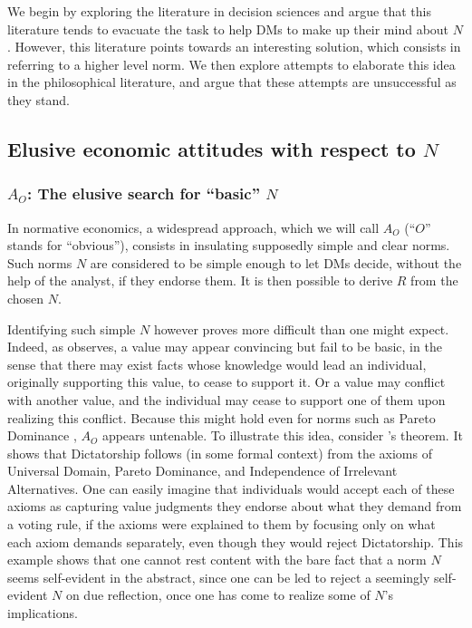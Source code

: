 \documentclass[preprint, french, english, 11pt, authoryear]{elsarticle}%
\newcommand{\protectforpdf}[1]{\texorpdfstring{\ensuremath{#1}}{#1}}
\begin{document}
We begin by exploring the literature in decision sciences and argue that this literature tends to evacuate the task to help \acp{DM} to make up their mind about $N$.
However, this literature points towards an interesting solution, which consists in referring to a higher level norm.
We then explore attempts to elaborate this idea in the philosophical literature, and argue that these attempts are unsuccessful as they stand.

\subsection{Elusive economic attitudes with respect to \protectforpdf{N}}
\subsubsection{\texorpdfstring{$A_O$}{AO}: The elusive search for ``basic'' \protectforpdf{N}}
In normative economics, a widespread approach, which we will call $A_O$ (``$O$'' stands for “obvious”), consists in insulating supposedly simple and clear norms. 
Such norms $N$ are considered to be simple enough to let \acp{DM} decide, without the help of the analyst, if they endorse them. It is then possible to derive $R$ from the chosen $N$.

Identifying such simple $N$ however proves more difficult than one might expect. 
Indeed, as \citet{sen_nature_1967} observes, a value may appear convincing but fail to be basic, in the sense that there may exist facts whose knowledge would lead an individual, originally supporting this value, to cease to support it. Or a value may conflict with another value, and the individual may cease to support one of them upon realizing this conflict.
Because this might hold even for norms such as Pareto Dominance \citep[ch. 5 and 6]{sen_collective_1984}, $A_O$ appears untenable.
To illustrate this idea, consider \citeauthor{arrow_social_2012}’s \citeyearpar{arrow_social_2012} theorem.
It shows that Dictatorship follows (in some formal context) from the axioms of Universal Domain, Pareto Dominance, and Independence of Irrelevant Alternatives.
One can easily imagine that individuals would accept each of these axioms as capturing value judgments they endorse about what they demand from a voting rule, if the axioms were explained to them by focusing only on what each axiom demands separately, even though they would reject Dictatorship.
This example shows that one cannot rest content with the bare fact that a norm $N$ seems self-evident in the abstract, since one can be led to reject a seemingly self-evident $N$ on due reflection, once one has come to realize some of $N$'s implications.
\end{document}
